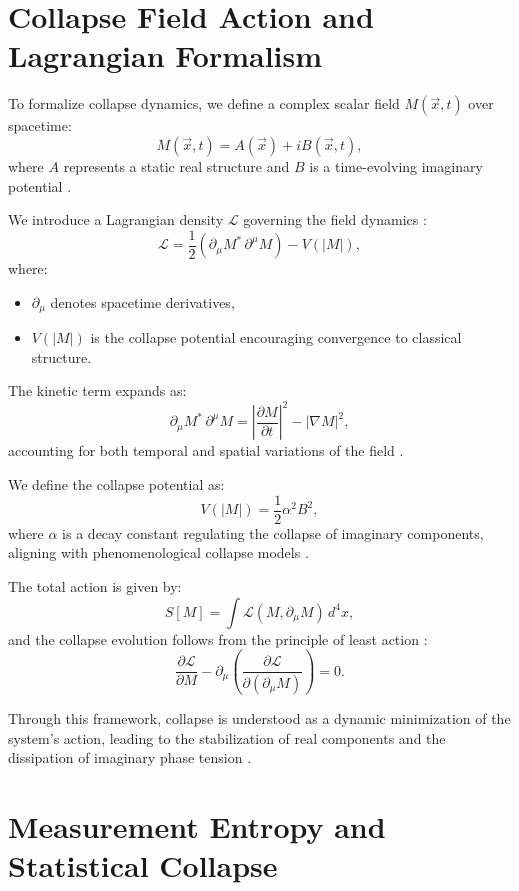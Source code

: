 \section{Collapse Field Action and Lagrangian Formalism}

To formalize collapse dynamics, we define a complex scalar field $M(\vec{x},t)$ over spacetime:
\[
M(\vec{x}, t) = A(\vec{x}) + i B(\vec{x}, t),
\]
where $A$ represents a static real structure and $B$ is a time-evolving imaginary potential \cite{euler_complex_plane,euler_formula_foundation}.

We introduce a Lagrangian density $\mathcal{L}$ governing the field dynamics \cite{courant1941methods,arnold1989mathematical}:
\[
\mathcal{L} = \frac{1}{2} \left( \partial_\mu M^* \, \partial^\mu M \right) - V(|M|),
\]
where:
\begin{itemize}
    \item $\partial_\mu$ denotes spacetime derivatives,
    \item $V(|M|)$ is the collapse potential encouraging convergence to classical structure.
\end{itemize}

The kinetic term expands as:
\[
\partial_\mu M^* \, \partial^\mu M = \left| \frac{\partial M}{\partial t} \right|^2 - \left| \nabla M \right|^2,
\]
accounting for both temporal and spatial variations of the field \cite{dirac1930principles}.

We define the collapse potential as:
\[
V(|M|) = \frac{1}{2} \alpha^2 B^2,
\]
where $\alpha$ is a decay constant regulating the collapse of imaginary components, aligning with phenomenological collapse models \cite{bassi_models_2013,penrose_gravity_1996}.

The total action is given by:
\[
S[M] = \int \mathcal{L}(M, \partial_\mu M) \, d^4x,
\]
and the collapse evolution follows from the principle of least action \cite{arnold1989mathematical}:
\[
\frac{\partial \mathcal{L}}{\partial M} - \partial_\mu \left( \frac{\partial \mathcal{L}}{\partial (\partial_\mu M)} \right) = 0.
\]

Through this framework, collapse is understood as a dynamic minimization of the system's action, leading to the stabilization of real components and the dissipation of imaginary phase tension \cite{zurek_decoherence,penrose_diosi_model}.


\section{Measurement Entropy and Statistical Collapse}


